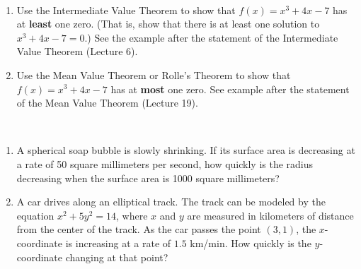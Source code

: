 \documentclass{article}[12pt]
\begin{document}
\begin{problem}~
\begin{enumerate}
\item Use the Intermediate Value Theorem to show that $f(x) = x^3 + 4x - 7$ has at {\bf least} one zero. (That is, show that 
there is at least one solution to $x^3 + 4x - 7 = 0$.) See the example after the statement of the Intermediate Value Theorem (Lecture 6).


\item Use the Mean Value Theorem or Rolle's Theorem to show that $f(x) = x^3 + 4x - 7$ has at {\bf most} one zero. 
See example after the statement of the Mean Value Theorem (Lecture 19).

\end{enumerate}
\end{problem}

\begin{problem}~
\begin{enumerate}
\item A spherical soap bubble is slowly shrinking. If its surface area is decreasing at a rate of 50 square millimeters per
second, how quickly is the radius decreasing when the surface area is 1000 square millimeters?

\item A car drives along an elliptical track. The track can be modeled by the equation $x^2 + 5y^2 = 14$, where $x$ and $y$ are 
measured in kilometers of distance from the center of the track. As the car passes the point $(3, 1)$, the $x$-coordinate is 
increasing at a rate of $1.5$ km/min. How quickly is the $y$-coordinate changing at that point?

\end{enumerate}
\end{problem}
\end{document}
